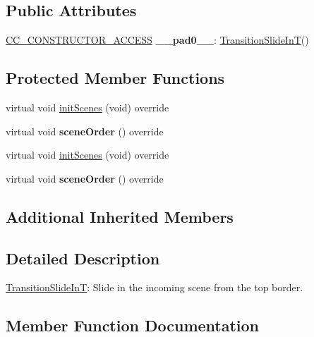 \subsection*{Public Attributes}
\begin{DoxyCompactItemize}
\item 
\mbox{\label{classTransitionSlideInT_acbea5bb4caab4b403c6bbbef07ff6da8}} 
\hyperlink{_2cocos2d_2cocos_2base_2ccConfig_8h_a25ef1314f97c35a2ed3d029b0ead6da0}{C\+C\+\_\+\+C\+O\+N\+S\+T\+R\+U\+C\+T\+O\+R\+\_\+\+A\+C\+C\+E\+SS} {\bfseries \+\_\+\+\_\+pad0\+\_\+\+\_\+}\+: \hyperlink{classTransitionSlideInT}{Transition\+Slide\+InT}()
\end{DoxyCompactItemize}
\subsection*{Protected Member Functions}
\begin{DoxyCompactItemize}
\item 
virtual void \hyperlink{classTransitionSlideInT_a3bd7d1724466523acee846e73e42f7d2}{init\+Scenes} (void) override
\item 
\mbox{\label{classTransitionSlideInT_a3f83d8f7759ddfc7f762f0914c89ea26}} 
virtual void {\bfseries scene\+Order} () override
\item 
virtual void \hyperlink{classTransitionSlideInT_a974e6dd9c9fe6159497bf3196e383a43}{init\+Scenes} (void) override
\item 
\mbox{\label{classTransitionSlideInT_a529c52e83ee358af7463eea5a6f45e93}} 
virtual void {\bfseries scene\+Order} () override
\end{DoxyCompactItemize}
\subsection*{Additional Inherited Members}


\subsection{Detailed Description}
\hyperlink{classTransitionSlideInT}{Transition\+Slide\+InT}\+: Slide in the incoming scene from the top border. 

\subsection{Member Function Documentation}
\mbox{\label{classTransitionSlideInT_a014b428d93b31e8ef5075865a5de9c63}} 
